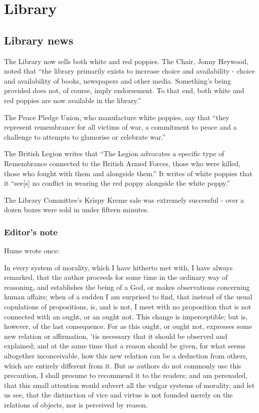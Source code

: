 \chapter{Library}\label{introduction}

\section{Library news}\label{library-news}

The Library now sells both white and red poppies. The Chair, Jonny
Heywood, noted that ``the library primarily exists to increase choice
and availability - choice and availability of books, newspapers and
other media. Something's being provided does not, of course, imply
endorsement. To that end, both white and red poppies are now available
in the library.''

The Peace Pledge Union, who manufacture white poppies, say that ``they
represent remembrance for all victims of war, a commitment to peace and
a challenge to attempts to glamorise or celebrate war.''

The British Legion writes that ``The Legion advocates a specific type of
Remembrance connected to the British Armed Forces, those who were
killed, those who fought with them and alongside them.'' It writes of
white poppies that it ``see{[}s{]} no conflict in wearing the red poppy
alongside the white poppy.''

The Library Committee's Krispy Kreme sale was extremely successful -
over a dozen boxes were sold in under fifteen minutes.

\subsection{Editor's note}\label{editors-note}

Hume wrote once:

In every system of morality, which I have hitherto met with, I have
always remarked, that the author proceeds for some time in the ordinary
way of reasoning, and establishes the being of a God, or makes
observations concerning human affairs; when of a sudden I am surprised
to find, that instead of the usual copulations of propositions, is, and
is not, I meet with no proposition that is not connected with an ought,
or an ought not. This change is imperceptible; but is, however, of the
last consequence. For as this ought, or ought not, expresses some new
relation or affirmation, 'tis necessary that it should be observed and
explained; and at the same time that a reason should be given, for what
seems altogether inconceivable, how this new relation can be a deduction
from others, which are entirely different from it. But as authors do not
commonly use this precaution, I shall presume to recommend it to the
readers; and am persuaded, that this small attention would subvert all
the vulgar systems of morality, and let us see, that the distinction of
vice and virtue is not founded merely on the relations of objects, nor
is perceived by reason.

